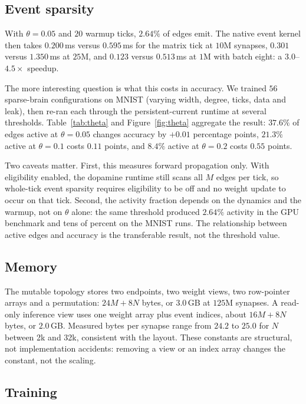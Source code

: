 \documentclass[11pt]{article}
\begin{document}
\subsection{Event sparsity}

With $\theta = 0.05$ and $20$ warmup ticks, $2.64\%$ of edges emit. The native
event kernel then takes $0.200$\,ms versus $0.595$\,ms for the matrix tick at
$10$M synapses, $0.301$ versus $1.350$\,ms at $25$M, and $0.123$ versus
$0.513$\,ms at $1$M with batch eight: a $3.0$--$4.5\times$ speedup.

The more interesting question is what this costs in accuracy. We trained $56$
sparse-brain configurations on MNIST (varying width, degree, ticks, data and
leak), then re-ran each through the persistent-current runtime at several
thresholds. Table~\ref{tab:theta} and Figure~\ref{fig:theta} aggregate the
result: $37.6\%$ of edges active at $\theta = 0.05$ changes accuracy by
$+0.01$ percentage points, $21.3\%$ active at $\theta = 0.1$ costs $0.11$ points,
and $8.4\%$ active at $\theta = 0.2$ costs $0.55$ points.




Two caveats matter. First, this measures forward propagation only. With
eligibility enabled, the dopamine runtime still scans all $M$ edges per tick, so
whole-tick event sparsity requires eligibility to be off and no weight update to
occur on that tick. Second, the activity fraction depends on the dynamics and the
warmup, not on $\theta$ alone: the same threshold produced $2.64\%$ activity in
the GPU benchmark and tens of percent on the MNIST runs. The relationship between
active edges and accuracy is the transferable result, not the threshold value.

\subsection{Memory}

The mutable topology stores two endpoints, two weight views, two row-pointer
arrays and a permutation: $24M + 8N$ bytes, or $3.0$\,GB at $125$M synapses. A
read-only inference view uses one weight array plus event indices, about
$16M + 8N$ bytes, or $2.0$\,GB. Measured bytes per synapse range from $24.2$ to
$25.0$ for $N$ between 2k and 32k, consistent with the layout. These constants are
structural, not implementation accidents: removing a view or an index array
changes the constant, not the scaling.

\subsection{Training}
\end{document}
